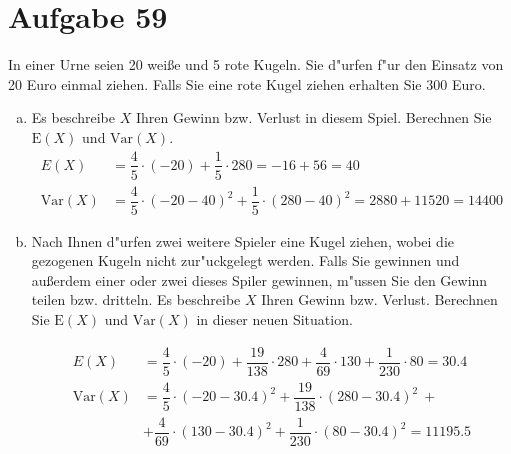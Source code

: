 \section{Aufgabe 59}
\setcounter{section}{59}

In einer Urne seien 20 wei{\ss}e und 5 rote Kugeln. Sie d"urfen f"ur den
Einsatz von 20 Euro einmal ziehen. Falls Sie eine rote Kugel ziehen erhalten
Sie 300 Euro.
\begin{enumerate}[(a)]
    \item Es beschreibe $X$ Ihren Gewinn bzw. Verlust in diesem Spiel.
        Berechnen Sie $\text{E}(X)$ und $\text{Var}(X)$.
        \begin{align*}
            E(X)          &= \dfrac{4}{5} \cdot (-20) + \dfrac{1}{5} \cdot 280 = -16 + 56 = 40 \\[5pt]
            \text{Var}(X) &= \dfrac{4}{5} \cdot (-20 - 40)^2 + \dfrac{1}{5} \cdot (280 - 40)^2 = 2880 + 11520 = 14400
        \end{align*}
    \item Nach Ihnen d"urfen zwei weitere Spieler eine Kugel ziehen, wobei die
        gezogenen Kugeln nicht zur"uckgelegt werden. Falls Sie gewinnen und
        au{\ss}erdem einer oder zwei dieses Spiler gewinnen, m"ussen Sie den
        Gewinn teilen bzw. dritteln. Es beschreibe $X$ Ihren Gewinn bzw. Verlust.
        Berechnen Sie $\text{E}(X)$ und $\text{Var}(X)$ in dieser neuen Situation.

        \begin{align*}
            E(X)          &= \dfrac{4}{5} \cdot (-20) + \dfrac{19}{138} \cdot 280 + \dfrac{4}{69} \cdot 130 + \dfrac{1}{230} \cdot 80 = 30.4 \\[5pt]
            \text{Var}(X) &= \dfrac{4}{5} \cdot (-20 - 30.4)^2 + \dfrac{19}{138} \cdot (280 - 30.4)^2\ + \\[5pt]
                          &+ \dfrac{4}{69} \cdot (130 - 30.4)^2 + \dfrac{1}{230} \cdot (80 - 30.4)^2 = 11195.5
        \end{align*}
\end{enumerate}
